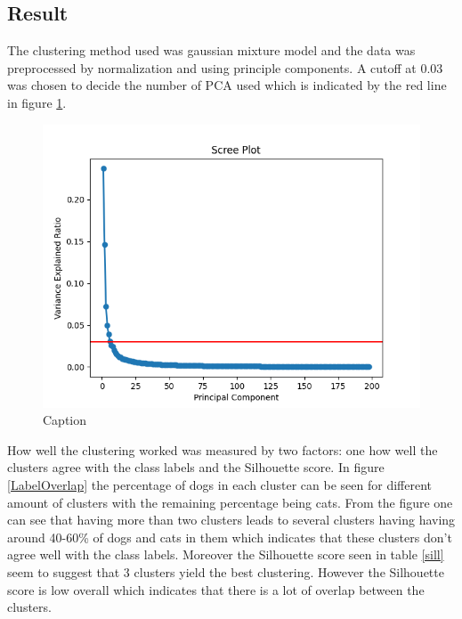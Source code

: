 \documentclass{article}
\begin{document}
\subsection{Result}
The clustering method used was gaussian mixture model and the data was preprocessed by normalization and using principle components. A cutoff at 0.03 was chosen to decide the number of PCA used which is indicated by the red line in figure \ref{scree}.   
\begin{figure}[H]
    \centering
    \includegraphics[scale=0.4]{1c/Scree plot.png}
    \caption{Caption}
    \label{scree}
\end{figure}
How well the clustering worked was measured by two factors: one how well the clusters agree with the class labels and the Silhouette score. In figure \ref{LabelOverlap} the percentage of dogs in each cluster can be seen for different amount of clusters with the remaining percentage being cats. From the figure one can see that having more than two clusters leads to several clusters having having around 40-60\% of dogs and cats in them which indicates that these clusters don't agree well with the class labels. Moreover the Silhouette score seen in table \ref{sill} seem to suggest that 3 clusters yield the best clustering. However the Silhouette score is low overall which indicates that there is a lot of overlap between the clusters.      
\end{document}
